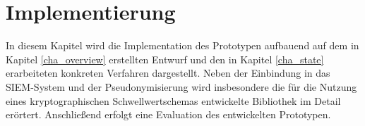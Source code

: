 \chapter{Implementierung}

\label{cha_implementation}

In diesem Kapitel wird die Implementation des Prototypen aufbauend auf dem in Kapitel \ref{cha_overview} erstellten Entwurf und den in Kapitel \ref{cha_state} erarbeiteten konkreten Verfahren dargestellt. Neben der Einbindung in das SIEM-System und der Pseudonymisierung wird insbesondere die für die Nutzung eines kryptographischen Schwellwertschemas entwickelte Bibliothek im Detail erörtert. Anschließend erfolgt eine Evaluation des entwickelten Prototypen.























